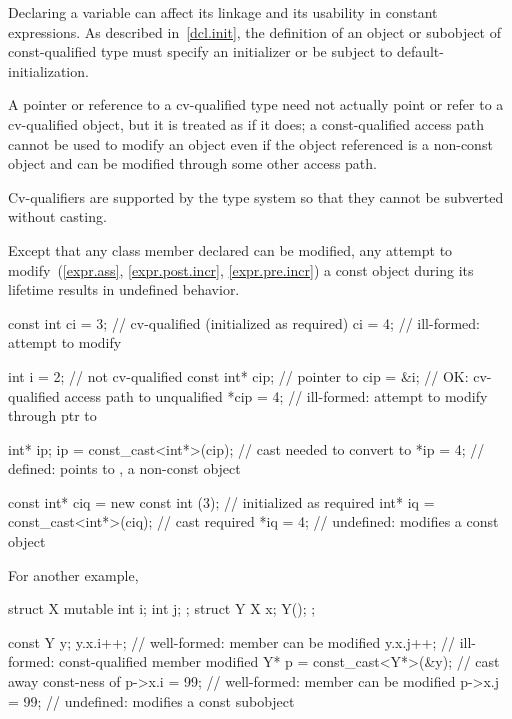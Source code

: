 \pnum
\begin{note}
Declaring a variable  can affect its linkage
and its usability in constant expressions. As
described in~\ref{dcl.init}, the definition of an object or subobject
of const-qualified type must specify an initializer or be subject to
default-initialization.
\end{note}

\pnum
A pointer or reference to a cv-qualified type need not actually point or
refer to a cv-qualified object, but it is treated as if it does; a
const-qualified access path cannot be used to modify an object even if
the object referenced is a non-const object and can be modified through
some other access path.
\begin{note}
Cv-qualifiers are supported by the type system so that they cannot be
subverted without casting.
\end{note}

\pnum
{}%
Except that any class member declared 
can be modified, any attempt to modify~(\ref{expr.ass},
\ref{expr.post.incr}, \ref{expr.pre.incr}) a
const object during its
lifetime results in undefined behavior.
\begin{example}
\begin{codeblock}
const int ci = 3;                       // cv-qualified (initialized as required)
ci = 4;                                 // ill-formed: attempt to modify 

int i = 2;                              // not cv-qualified
const int* cip;                         // pointer to 
cip = &i;                               // OK: cv-qualified access path to unqualified
*cip = 4;                               // ill-formed: attempt to modify through ptr to 

int* ip;
ip = const_cast<int*>(cip);             // cast needed to convert  to 
*ip = 4;                                // defined:  points to , a non-const object

const int* ciq = new const int (3);     // initialized as required
int* iq = const_cast<int*>(ciq);        // cast required
*iq = 4;                                // undefined: modifies a const object
\end{codeblock}
For another example,
\begin{codeblock}
struct X {
  mutable int i;
  int j;
};
struct Y {
  X x;
  Y();
};

const Y y;
y.x.i++;                                // well-formed:  member can be modified
y.x.j++;                                // ill-formed: const-qualified member modified
Y* p = const_cast<Y*>(&y);              // cast away const-ness of 
p->x.i = 99;                            // well-formed:  member can be modified
p->x.j = 99;                            // undefined: modifies a const subobject
\end{codeblock}
\end{example}

